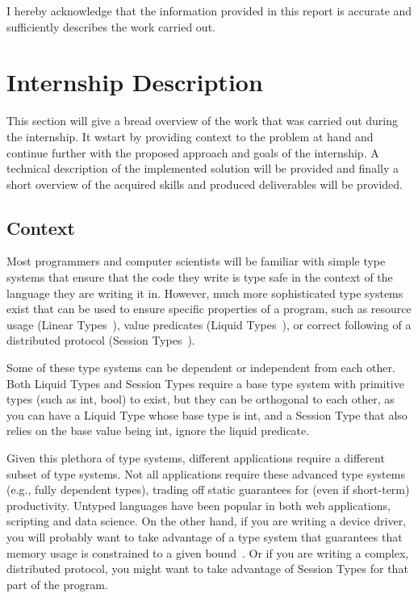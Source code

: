 \documentclass{easychair}
\begin{document}
I hereby acknowledge that the information provided in this report is accurate and sufficiently describes the work carried out.
\vfill
\par\noindent\makebox[2.5in]{\hrulefill} \hfill\makebox[2.5in]{\hrulefill}%
\par\noindent{}      \hfill{}%
\par\noindent{}      \hfill{}%
\newpage
\section{Internship Description}
This section will give a bread overview of the work that was carried out during the internship. It wstart by providing context to the problem at hand and continue further with the proposed approach and goals of the internship. A technical description of the implemented solution will be provided and finally a short overview of the acquired skills and produced deliverables will be provided.

\subsection{Context}
\label{sec:context}
Most programmers and computer scientists will be familiar with simple type systems that ensure that the code they write is type safe in the context of the language they are writing it in. However, much more sophisticated type systems exist that can be used to ensure specific properties of a program, such as resource usage (Linear Types~\cite{linear}), value predicates (Liquid Types~\cite{DBLP:conf/pldi/RondonKJ08}), or correct following of a distributed protocol (Session Types~\cite{session}).

Some of these type systems can be dependent or independent from each other. Both Liquid Types and Session Types require a base type system with primitive types (such as int, bool) to exist, but they can be orthogonal to each other, as you can have a Liquid Type whose base type is int, and a Session Type that also relies on the base value being int, ignore the liquid predicate.

Given this plethora of type systems, different applications require a different subset of type systems. Not all applications require these advanced type systems (e.g., fully dependent types), trading off static guarantees for (even if short-term) productivity. Untyped languages have been popular in both web applications, scripting and data science. On the other hand, if you are writing a device driver, you will probably want to take advantage of a type system that guarantees that memory usage is constrained to a given bound~\cite{liquidate-assets}. Or if you are writing a complex, distributed protocol, you might want to take advantage of Session Types for that part of the program.
\end{document}
